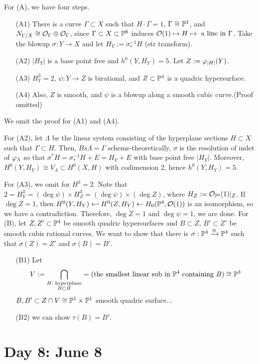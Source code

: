 \documentclass{../../small}
\begin{document}
For (A), we have four steps.
\begin{enumerate}
\item[(A1)] There is a curve $\Gamma\subset X$ such that $H\cdot\Gamma=1$, $\Gamma\cong\P^1$, and $N_{\Gamma/X}\cong\cO_\Gamma\oplus\cO_\Gamma$, since $\Gamma\subset X\subset\P^6$ induces $\cO(1)\mapsto H\mapsto\text{ a line in $\Gamma$}$.
Take the blowup $\sigma:Y\to X$ and let $H_Y:=\sigma_*^{-1}H$ (str transform).
\item[(A2)] $|H_Y|$ is a base point free and $h^0(Y,H_Y)=5$.
Let $Z:=\f_{|H|}(Y)$.
\item[(A3)] $H_Y^3=2$, $\psi:Y\to Z$ is birational, and $Z\subset\P^4$ is a quadric hypersurface.
\item[(A4)] Also, $Z$ is smooth, and $\psi$ is a blowup along a smooth cubic curve.(Proof omitted)
\end{enumerate}
We omit the proof for (A1) and (A4).

For (A2), let $\Lambda$ be the linear system consisting of the hyperplane sections $H\subset X$ such that $\Gamma\subset H$.
Then, $Bs\Lambda=\Gamma$ scheme-theoretically, $\sigma$ is the resolution of indet of $\f_\Lambda$ so that $\sigma^*H=\sigma_*^{-1}H+E=H_Y+E$ with base point free $|H_Y|$.
Moreover, $H^0(Y,H_Y)\cong V_\Lambda\subset H^0(X,H)$ with codimension 2, hence $h^0(Y,H_Y)=5$.

For (A3), we omit for $H^3=2$.
Note that $2=H_Y^3=(\deg\psi)\times H_Z^3=(\deg\psi)\times(\deg Z)$, where $H_Z:=\cO_{\P^4}(1)|_Z$.
If $\deg Z=1$, then $H^0(Y,H_Y)\hookleftarrow H^0(Z,H_Y)\leftarrow H_0(\P^4,\cO(1))$ is an isomorphism, so we have a contradiction.
Therefore, $\deg Z=1$ and $\deg\psi=1$, we are done.
\bigskip
For (B), let $Z,Z'\subset\P^4$ be smooth quadric hypersurfaces and $B\subset Z,\,B'\subset Z'$ be smooth cubis rational curves.
We want to show that there is $\sigma:\P^4\xrightarrow{\cong}\P^4$ such that $\sigma(Z)=Z'$ and $\sigma(B)=B'$.
\begin{enumerate}
\item[(B1)] Let
\[V:=\bigcap_{\substack{H:\text{ hyperplane}\\B\subset H}}=(\text{the smallest linear sub in $\P^4$ containing $B$})\cong\P^3\]
$B,B'\subset Z\cap V\cong\P^1\times\P^1$ smooth quadric surface...
\item[(B2)] we can show $\tau(B)=B'$.
\end{enumerate}


\newpage
\section{Day 8: June 8}
\end{document}
